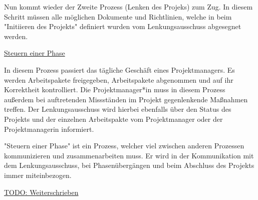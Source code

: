 Nun kommt wieder der Zweite Prozess (Lenken des Projeks) zum Zug. In diesem Schritt müssen alle möglichen Dokumente und Richtlinien, welche in beim "Initiieren des Projekts" definiert wurden vom Lenkungsausschuss abgesegnet werden. \cite{Prince2} \cite{Stakeholder}

\underline{Steuern einer Phase}

In diesem Prozess passiert das tägliche Geschäft eines Projektmanagers. Es werden Arbeitspakete freigegeben, Arbeitspakete abgenommen und auf ihr Korrektheit kontrolliert. Die Projektmanager*in muss in diesem Prozess außerdem bei auftretenden Missständen im Projekt gegenlenkende Maßnahmen treffen. Der Lenkungsausschuss wird hierbei ebenfalls über den Status des Projekts und der einzelnen Arbeitspakte vom Projektmanager oder der Projektmanagerin informiert.

"Steuern einer Phase" ist ein Prozess, welcher viel zwischen anderen Prozessen kommunizieren und zusammenarbeiten muss. Er wird in der Kommunikation mit dem Lenkungsausschuss, bei Phasenübergängen und beim Abschluss des Projekts immer miteinbezogen.

\underline{}

\underline{TODO: Weiterschrieben}
